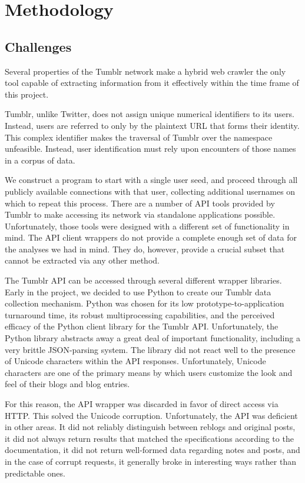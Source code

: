 \section{Methodology}
\label{sec:-method}

\subsection{Challenges}
Several properties of the Tumblr network make a hybrid web crawler the 
only tool capable of extracting information from it effectively within 
the time frame of this project.  

Tumblr, unlike Twitter, does not assign unique numerical identifiers 
to its users.  Instead, users are referred to only by the plaintext URL 
that forms their identity.  This complex identifier makes the traversal 
of Tumblr over the namespace unfeasible.  Instead, user identification 
must rely upon encounters of those names in a corpus of data.

We construct a program to start with a single user seed, and proceed 
through all publicly available connections with that user, collecting 
additional usernames on which to repeat this process.  There are a 
number of API tools provided by Tumblr to make accessing its network 
via standalone applications possible.  Unfortunately, those tools were 
designed with a different set of functionality in mind.  The API 
client wrappers do not provide a complete enough set of data for the 
analyses we had in mind.  They do, however, provide a crucial subset 
that cannot be extracted via any other method.

The Tumblr API can be accessed through several different wrapper 
libraries.  Early in the project, we decided to use Python to create 
our Tumblr data collection mechanism.  Python was chosen for its 
low prototype-to-application turnaround time, its robust 
multiprocessing capabilities, and the perceived efficacy of the 
Python client library for the Tumblr API.  Unfortunately, the Python 
library abstracts away a great deal of important functionality, 
including a very brittle JSON-parsing system.  The library did not 
react well to the presence of Unicode characters within the API 
responses.  Unfortunately, Unicode characters are one of the primary 
means by which users customize the look and feel of their blogs and 
blog entries.

For this reason, the API wrapper was discarded in favor of direct 
access via HTTP.  This solved the Unicode corruption.  Unfortunately, 
the API was deficient in other areas.  It did not reliably distinguish 
between reblogs and original posts, it did not always return results 
that matched the specifications according to the documentation, it did 
not return well-formed data regarding notes and posts, and in the case 
of corrupt requests, it generally broke in interesting ways rather 
than predictable ones.


